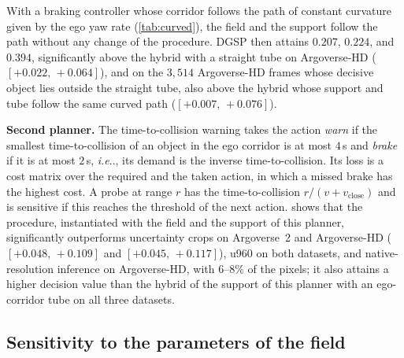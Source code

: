 \documentclass[10pt,letterpaper]{article}
\makeatletter
\DeclareRobustCommand\onedot{\futurelet\@let@token\@onedot}
\def\@onedot{\ifx\@let@token.\else.\null\fi\xspace}
\def\ie{\emph{i.e}\onedot} \def\Ie{\emph{I.e}\onedot}
\newcommand{\method}{DGSP\xspace}
\newcommand{\vclose}{v_{\mathrm{close}}}
\newcommand{\ci}[2]{[#1,\allowbreak\,#2]}
\theoremstyle{remark}
\theoremstyle{plain}
\theoremstyle{definition}
\makeatother
\begin{document}
With a braking controller whose corridor follows the path of constant curvature given by the ego yaw rate (\cref{tab:curved}), the field and the support follow the path without any change of the procedure.
\method then attains $0.207$, $0.224$, and $0.394$, significantly above the hybrid with a straight tube on Argoverse-HD ($\ci{+0.022}{+0.064}$), and on the $3{,}514$ Argoverse-HD frames whose decisive object lies outside the straight tube, also above the hybrid whose support and tube follow the same curved path ($\ci{+0.007}{+0.076}$).

\noindent\textbf{Second planner.}
The time-to-collision warning takes the action \emph{warn} if the smallest time-to-collision of an object in the ego corridor is at most $4$\,s and \emph{brake} if it is at most $2$\,s, \ie, its demand is the inverse time-to-collision.
Its loss is a cost matrix over the required and the taken action, in which a missed brake has the highest cost.
A probe at range $r$ has the time-to-collision $r/(v+\vclose)$ and is sensitive if this reaches the threshold of the next action.
 shows that the procedure, instantiated with the field and the support of this planner, significantly outperforms uncertainty crops on Argoverse~2 and Argoverse-HD ($\ci{+0.048}{+0.109}$ and $\ci{+0.045}{+0.117}$), u960 on both datasets, and native-resolution inference on Argoverse-HD, with $6$--$8\%$ of the pixels; it also attains a higher decision value than the hybrid of the support of this planner with an ego-corridor tube on all three datasets.

\subsection{Sensitivity to the parameters of the field}
\label{sec:supp_grid}
\end{document}
